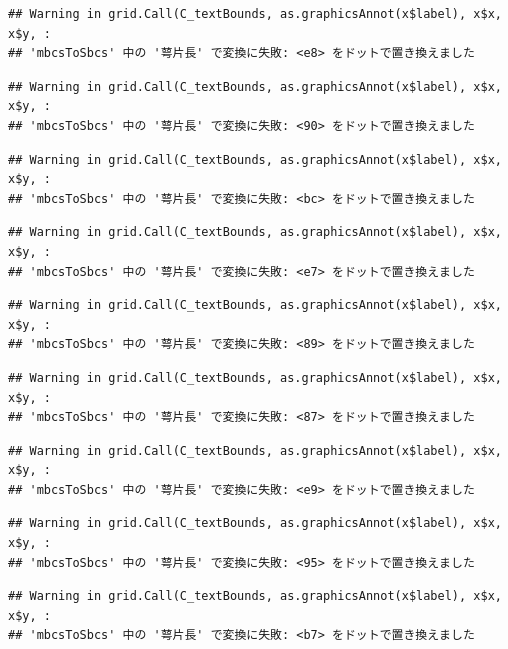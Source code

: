 \documentclass[
]{book}
\begin{document}
\begin{verbatim}
## Warning in grid.Call(C_textBounds, as.graphicsAnnot(x$label), x$x, x$y, :
## 'mbcsToSbcs' 中の '萼片長' で変換に失敗: <e8> をドットで置き換えました
\end{verbatim}

\begin{verbatim}
## Warning in grid.Call(C_textBounds, as.graphicsAnnot(x$label), x$x, x$y, :
## 'mbcsToSbcs' 中の '萼片長' で変換に失敗: <90> をドットで置き換えました
\end{verbatim}

\begin{verbatim}
## Warning in grid.Call(C_textBounds, as.graphicsAnnot(x$label), x$x, x$y, :
## 'mbcsToSbcs' 中の '萼片長' で変換に失敗: <bc> をドットで置き換えました
\end{verbatim}

\begin{verbatim}
## Warning in grid.Call(C_textBounds, as.graphicsAnnot(x$label), x$x, x$y, :
## 'mbcsToSbcs' 中の '萼片長' で変換に失敗: <e7> をドットで置き換えました
\end{verbatim}

\begin{verbatim}
## Warning in grid.Call(C_textBounds, as.graphicsAnnot(x$label), x$x, x$y, :
## 'mbcsToSbcs' 中の '萼片長' で変換に失敗: <89> をドットで置き換えました
\end{verbatim}

\begin{verbatim}
## Warning in grid.Call(C_textBounds, as.graphicsAnnot(x$label), x$x, x$y, :
## 'mbcsToSbcs' 中の '萼片長' で変換に失敗: <87> をドットで置き換えました
\end{verbatim}

\begin{verbatim}
## Warning in grid.Call(C_textBounds, as.graphicsAnnot(x$label), x$x, x$y, :
## 'mbcsToSbcs' 中の '萼片長' で変換に失敗: <e9> をドットで置き換えました
\end{verbatim}

\begin{verbatim}
## Warning in grid.Call(C_textBounds, as.graphicsAnnot(x$label), x$x, x$y, :
## 'mbcsToSbcs' 中の '萼片長' で変換に失敗: <95> をドットで置き換えました
\end{verbatim}

\begin{verbatim}
## Warning in grid.Call(C_textBounds, as.graphicsAnnot(x$label), x$x, x$y, :
## 'mbcsToSbcs' 中の '萼片長' で変換に失敗: <b7> をドットで置き換えました
\end{verbatim}
\end{document}
